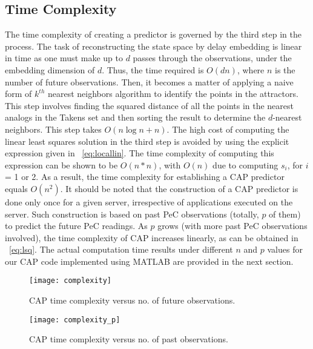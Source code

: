 \subsection{Time Complexity}  
The time complexity of creating a predictor is governed by the third
step in the process.  The task of reconstructing the state space by
delay embedding is linear in time as one must make up to $d$ passes
through the observations, under the embedding dimension of $d$.
Thus, the time required is $O(dn)$, where $n$ is the number of future
observations.  Then, it becomes a matter of applying a naive form of
$k^{th}$ nearest neighbors algorithm to identify the points in the
attractors.  This step involves finding the squared distance of all the
points in the nearest analogs in the Takens set and then sorting the
result to determine the $d$-nearest neighbors.  This step takes
$O(n\log{n}+n)$.  The high cost of computing the linear least squares
solution in the third step is avoided by using the explicit expression
given in \equationname~\eqref{eq:locallin}.  The time complexity of computing this
expression can be shown to be $O(n*n)$, with $O(n)$ due to computing
$s_{i}$, for $i$ = 1 or 2.  As a result, the time complexity for
establishing a CAP predictor equals $O(n^{2})$.  It should be noted that
the construction of a CAP predictor is done only once for a given
server, irrespective of applications executed on the server.  Such
construction is based on past PeC observations (totally, $p$ of them)
to predict the future PeC readings.  As $p$ grows (with more past PeC
observations involved), the time complexity of CAP increases linearly,
as can be obtained in \equationname~\eqref{eq:lsq}.  The actual computation time
results under different $n$ and $p$ values for our CAP code implemented
using MATLAB are provided in the next section.
\begin{figure}[tp]
    \centering
    \texttt{[image: complexity]}
    \caption{CAP time complexity versus no. of future observations.}
    \label{fig:complexity}
\end{figure}
\hspace{0.3cm}
\begin{figure}
    \centering
    \texttt{[image: complexity\_p]}
    \caption{CAP time complexity versus no. of past observations.}
    \label{fig:complexityp}
\end{figure}

